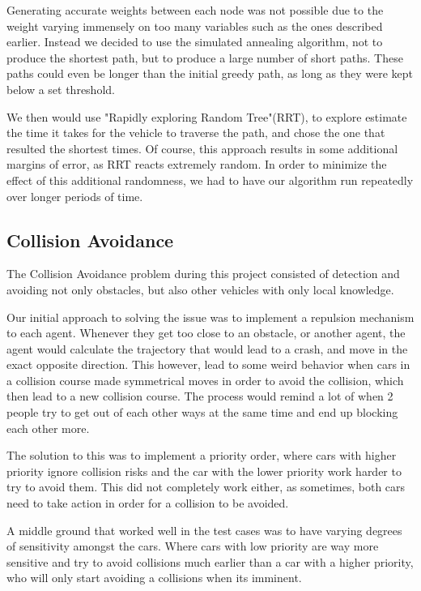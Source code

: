 \documentclass[a4paper,12pt]{article}
\begin{document}
Generating accurate weights between each node was not possible due to the weight varying immensely on too many variables such as the ones described earlier. Instead we decided to use the simulated annealing algorithm, not to produce the shortest path, but to produce a large number of short paths. These paths could even be longer than the initial greedy path, as long as they were kept below a set threshold. 

We then would use "Rapidly exploring Random Tree"(RRT), to explore estimate the time it takes for the vehicle to traverse the path, and chose the one that resulted the shortest times.
Of course, this approach results in some additional margins of error, as RRT reacts extremely random. In order to minimize the effect of this additional randomness, we had to have our algorithm run repeatedly over longer periods of time.


\subsection{Collision Avoidance}
\label{sec:pfinding}

The Collision Avoidance problem during this project consisted of detection and avoiding not only obstacles, but also other vehicles with only local knowledge.

Our initial approach to solving the issue was to implement a repulsion mechanism to each agent. Whenever they get too close to an obstacle, or another agent, the agent would calculate the trajectory that would lead to a crash, and move in the exact opposite direction.
This however, lead to some weird behavior when cars in a collision course made symmetrical moves in order to avoid the collision, which then lead to a new collision course. The process would remind a lot of when 2 people try to get out of each other ways at the same time and end up blocking each other more.

The solution to this was to implement a priority order, where cars with higher priority ignore collision risks and the car with the lower priority work harder to try to avoid them. This did not completely work either, as sometimes, both cars need to take action in order for a collision to be avoided. 

A middle ground that worked well in the test cases was to have varying degrees of sensitivity amongst the cars. Where cars with low priority are way more sensitive and try to avoid collisions much earlier than a car with a higher priority, who will only start avoiding a collisions when its imminent.
\end{document}
